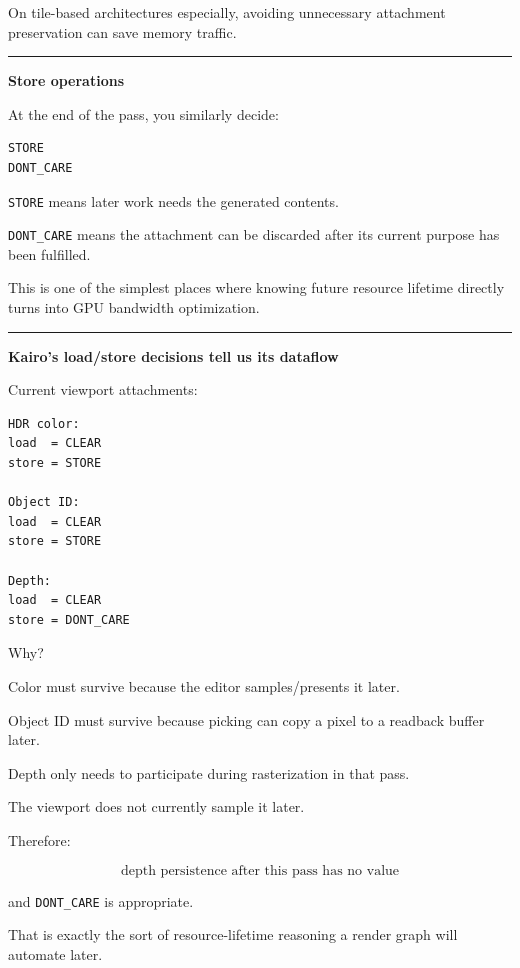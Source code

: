 On tile-based architectures especially, avoiding unnecessary attachment preservation can save memory traffic.

\begin{center}\rule{0.5\linewidth}{0.5pt}\end{center}

\textbf{Store operations}

At the end of the pass, you similarly decide:

\begin{verbatim}
STORE
DONT_CARE
\end{verbatim}

\texttt{STORE} means later work needs the generated contents.

\texttt{DONT\_CARE} means the attachment can be discarded after its current purpose has been fulfilled.

This is one of the simplest places where knowing future resource lifetime directly turns into GPU bandwidth optimization.

\begin{center}\rule{0.5\linewidth}{0.5pt}\end{center}

\textbf{Kairo's load/store decisions tell us its dataflow}

Current viewport attachments:

\begin{verbatim}
HDR color:
load  = CLEAR
store = STORE

Object ID:
load  = CLEAR
store = STORE

Depth:
load  = CLEAR
store = DONT_CARE
\end{verbatim}

Why?

Color must survive because the editor samples/presents it later.

Object ID must survive because picking can copy a pixel to a readback buffer later.

Depth only needs to participate during rasterization in that pass.

The viewport does not currently sample it later.

Therefore:

\[
\boxed{
\text{depth persistence after this pass has no value}
}
\]

and \texttt{DONT\_CARE} is appropriate.

That is exactly the sort of resource-lifetime reasoning a render graph will automate later.

